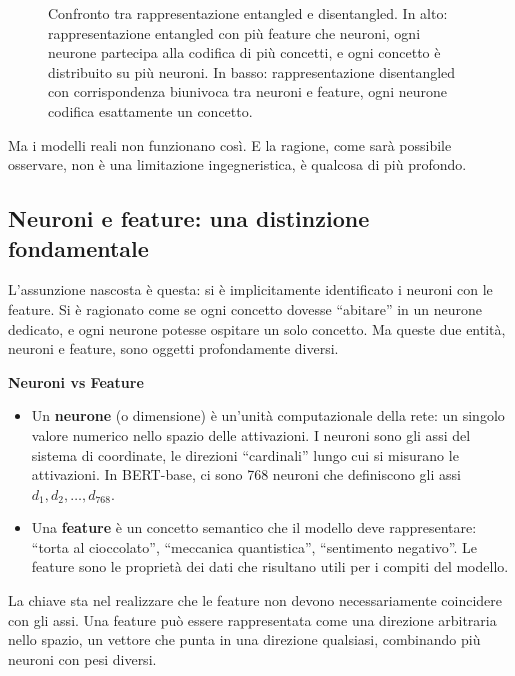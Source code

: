 \begin{figure}[htbp]
    \caption{Confronto tra rappresentazione entangled e disentangled. In alto: rappresentazione entangled con più feature che neuroni, ogni neurone partecipa alla codifica di più concetti, e ogni concetto è distribuito su più neuroni. In basso: rappresentazione disentangled con corrispondenza biunivoca tra neuroni e feature, ogni neurone codifica esattamente un concetto.}
    \label{fig:entangled_vs_disentangled_vert}
\end{figure}
Ma i modelli reali non funzionano così. E la ragione, come sarà possibile osservare, non è una limitazione ingegneristica, è qualcosa di più profondo.
\subsection{Neuroni e feature: una distinzione fondamentale}
\label{subsec:neuroni_feature}
L'assunzione nascosta è questa: si è implicitamente identificato i neuroni con le feature. Si è ragionato come se ogni concetto dovesse ``abitare'' in un neurone dedicato, e ogni neurone potesse ospitare un solo concetto. Ma queste due entità, neuroni e feature, sono oggetti profondamente diversi.
\begin{notebox}
\textbf{Neuroni vs Feature}
\begin{itemize}
    \item Un \textbf{neurone} (o dimensione) è un'unità computazionale della rete: un singolo valore numerico nello spazio delle attivazioni. I neuroni sono gli assi del sistema di coordinate, le direzioni ``cardinali'' lungo cui si misurano le attivazioni. In BERT-base, ci sono 768 neuroni che definiscono gli assi $d_1, d_2, \dots, d_{768}$.    
    \item Una \textbf{feature} è un concetto semantico che il modello deve rappresentare: ``torta al cioccolato'', ``meccanica quantistica'', ``sentimento negativo''. Le feature sono le proprietà dei dati che risultano utili per i compiti del modello.
\end{itemize}
\end{notebox}
La chiave sta nel realizzare che le feature non devono necessariamente coincidere con gli assi. Una feature può essere rappresentata come una direzione arbitraria nello spazio, un vettore che punta in una direzione qualsiasi, combinando più neuroni con pesi diversi.
